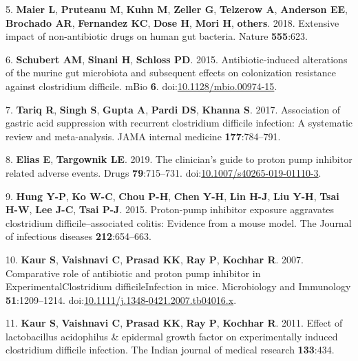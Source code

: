\documentclass[11pt,]{article}
\begin{document}
\hypertarget{ref-maier2018extensive}{}
5. \textbf{Maier L}, \textbf{Pruteanu M}, \textbf{Kuhn M},
\textbf{Zeller G}, \textbf{Telzerow A}, \textbf{Anderson EE},
\textbf{Brochado AR}, \textbf{Fernandez KC}, \textbf{Dose H},
\textbf{Mori H}, \textbf{others}. 2018. Extensive impact of
non-antibiotic drugs on human gut bacteria. Nature \textbf{555}:623.

\hypertarget{ref-Schubert2015}{}
6. \textbf{Schubert AM}, \textbf{Sinani H}, \textbf{Schloss PD}. 2015.
Antibiotic-induced alterations of the murine gut microbiota and
subsequent effects on colonization resistance against clostridium
difficile. mBio \textbf{6}.
doi:\href{https://doi.org/10.1128/mbio.00974-15}{10.1128/mbio.00974-15}.

\hypertarget{ref-tariq2017association}{}
7. \textbf{Tariq R}, \textbf{Singh S}, \textbf{Gupta A}, \textbf{Pardi
DS}, \textbf{Khanna S}. 2017. Association of gastric acid suppression
with recurrent clostridium difficile infection: A systematic review and
meta-analysis. JAMA internal medicine \textbf{177}:784--791.

\hypertarget{ref-Elias2019}{}
8. \textbf{Elias E}, \textbf{Targownik LE}. 2019. The clinician's guide
to proton pump inhibitor related adverse events. Drugs
\textbf{79}:715--731.
doi:\href{https://doi.org/10.1007/s40265-019-01110-3}{10.1007/s40265-019-01110-3}.

\hypertarget{ref-hung2015proton}{}
9. \textbf{Hung Y-P}, \textbf{Ko W-C}, \textbf{Chou P-H}, \textbf{Chen
Y-H}, \textbf{Lin H-J}, \textbf{Liu Y-H}, \textbf{Tsai H-W}, \textbf{Lee
J-C}, \textbf{Tsai P-J}. 2015. Proton-pump inhibitor exposure aggravates
clostridium difficile--associated colitis: Evidence from a mouse model.
The Journal of infectious diseases \textbf{212}:654--663.

\hypertarget{ref-Kaur2007}{}
10. \textbf{Kaur S}, \textbf{Vaishnavi C}, \textbf{Prasad KK},
\textbf{Ray P}, \textbf{Kochhar R}. 2007. Comparative role of antibiotic
and proton pump inhibitor in ExperimentalClostridium difficileInfection
in mice. Microbiology and Immunology \textbf{51}:1209--1214.
doi:\href{https://doi.org/10.1111/j.1348-0421.2007.tb04016.x}{10.1111/j.1348-0421.2007.tb04016.x}.

\hypertarget{ref-kaur2011effect}{}
11. \textbf{Kaur S}, \textbf{Vaishnavi C}, \textbf{Prasad KK},
\textbf{Ray P}, \textbf{Kochhar R}. 2011. Effect of lactobacillus
acidophilus \& epidermal growth factor on experimentally induced
clostridium difficile infection. The Indian journal of medical research
\textbf{133}:434.
\end{document}
